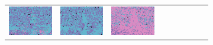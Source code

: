 \documentclass{ipol}
\begin{document}
\begin{figure}[ht]
\begin{subfigure}[t]{\linewidth}
\begin{tabular}{ccccccccc}
                \includegraphics[width=\s]{images/windmill/AHD/bid_med_64_grids.png}&
                \includegraphics[width=\s]{images/windmill/DCB/bid_med_64_grids.png}&
                \includegraphics[width=\s]{images/windmill/DHT/bid_med_64_grids.png}&

\end{tabular}
\end{subfigure}
\end{figure}
\end{document}
